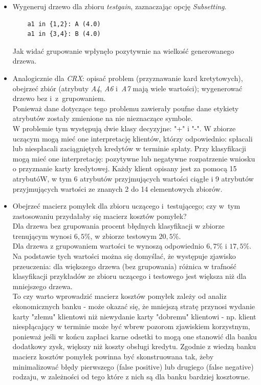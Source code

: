 \begin{itemize}
\item Wygeneruj drzewo dla zbioru \emph{testgain}, zaznaczając opcję \emph{Subsetting}.
	\begin{verbatim}
	a1 in {1,2}: A (4.0)
	a1 in {3,4}: B (4.0)
	\end{verbatim}
Jak widać grupowanie wpłynęło pozytywnie na wielkość generowanego drzewa.

\item Analogicznie dla \emph{CRX}: opisać problem (przyznawanie kard kretytowych), obejrzeć zbiór (atrybuty \emph{A4}, \emph{A6} i~\emph{A7} mają wiele wartości); wygenerować drzewo bez i~z~grupowaniem.
\\Ponieważ dane dotyczące tego problemu zawierały poufne dane etykiety atrybutów zostały zmienione na nie nieznaczące symbole.
\\W problemie tym występują dwie klasy decyzyjne: "+" i "-". W zbiorze uczącym mogą mieć one interpretację klientów, którzy odpowiednio: spłacali lub niespłacali zaciągniętych kredytów w terminie spłaty. Przy klasyfikacji mogą mieć one interpretację: pozytywne lub negatywne rozpatrzenie wniosku o przyznanie karty kredytowej.
Każdy klient opisany jest za pomocą 15 atrybutóW, w tym 6 atrybutów przyjmujących wartości ciągłe i 9 atrybutów przyjmujących wartości ze znanych 2 do 14 elementowych zbiorów.



\item Obejrzeć macierz pomyłek dla zbioru uczącego i~testującego; czy w~tym zastosowaniu przydałaby się macierz kosztów pomyłek?
\\Dla drzewa bez grupowania procent błędnych klasyfikacji w zbiorze trenującym wynosi $ 6,5\% $, w zbiorze testowym $20,5\%$.
\\Dla drzewa z grupowaniem wartości te wynoszą odpowiednio $6,7\%$ i $17,5\%$. Na podstawie tych wartości można się domyślać, że występuje zjawisko przeuczenia: dla większego drzewa 
(bez grupowania) różnica w trafność klasyfikacji przykładów ze zbioru uczącego i testowego jest większa niż dla mniejszego drzewa.
\\To czy warto wprowadzić macierz kosztów pomyłek zależy od analiz ekonomicznych banku - może okazać się, że mniejszą stratę przynosi wydanie karty "złemu" klientowi niż niewydanie karty "dobremu" klientowi - np. klient niespłącający w terminie może być wbrew pozorom zjawiskiem korzystnym, ponieważ jeśli w końcu zapłaci karne odsetki to mogą one stanowić dla banku dodatkowy zysk, większy niż koszty obsługi kredytu. Zgodnie z wiedzą banku macierz kosztów pomyłek powinna być skonstruowana tak, żeby minimalizować błędy pierwszego (false positive) lub drugiego (false negative) rodzaju, w zależności od tego które z nich są dla banku bardziej kosztowne.

\end{itemize}


